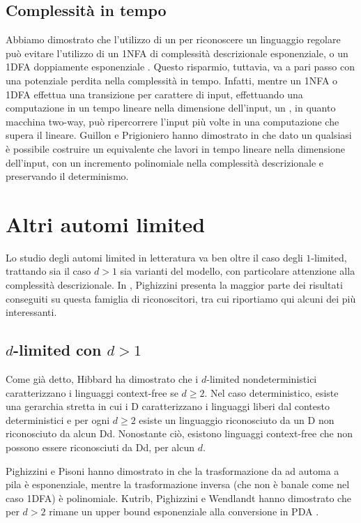 \subsection{Complessità in tempo}
Abbiamo dimostrato che l'utilizzo di un  per riconoscere un linguaggio regolare può evitare l'utilizzo di un 1NFA di complessità descrizionale esponenziale, o un 1DFA doppiamente esponenziale . Questo risparmio, tuttavia, va a pari passo con una potenziale perdita nella complessità in tempo. Infatti, mentre un 1NFA o 1DFA effettua una transizione per carattere di input, effettuando una computazione in un tempo lineare nella dimensione dell'input, un , in quanto macchina two-way, può ripercorrere l'input più volte in una computazione che supera il lineare. Guillon e Prigioniero hanno dimostrato in \cite{Guillon:19:linearlimited} che dato un qualsiasi  è possibile costruire un  equivalente che lavori in tempo lineare nella dimensione dell'input, con un incremento polinomiale nella complessità descrizionale e preservando il determinismo.



\section{Altri automi limited}
Lo studio degli automi limited in letteratura va ben oltre il caso degli $1$-limited, trattando sia il caso $d>1$ sia varianti del modello, con particolare attenzione alla complessità descrizionale. In \cite{Pighizzini:19:limited}, Pighizzini presenta la maggior parte dei risultati conseguiti su questa famiglia di riconoscitori, tra cui riportiamo qui alcuni dei più interessanti.


\subsection{\texorpdfstring{$d$-limited con $d>1$}{d-limited con d>1}}
Come già detto, Hibbard \cite{Hibbard:67:CFdet} ha dimostrato che i $d$-limited nondeterministici caratterizzano i linguaggi context-free se $d\geq2$. Nel caso deterministico, esiste una gerarchia stretta in cui i D caratterizzano i linguaggi liberi dal contesto deterministici e per ogni $d\geq2$ esiste un linguaggio riconosciuto da un D non riconosciuto da alcun D\la d. Nonostante ciò, esistono linguaggi context-free che non possono essere riconosciuti da D\la d, per alcun $d$.

Pighizzini e Pisoni hanno dimostrato in \cite{Pighizzini:14:limitedCF} che la trasformazione da  ad automa a pila è esponenziale, mentre la trasformazione inversa (che non è banale come nel caso 1DFA\tto{}) è polinomiale. Kutrib, Pighizzini e Wendlandt hanno dimostrato che per $d>2$ rimane un upper bound esponenziale alla conversione in PDA \cite{Kutrib:18:complexlimited}.


